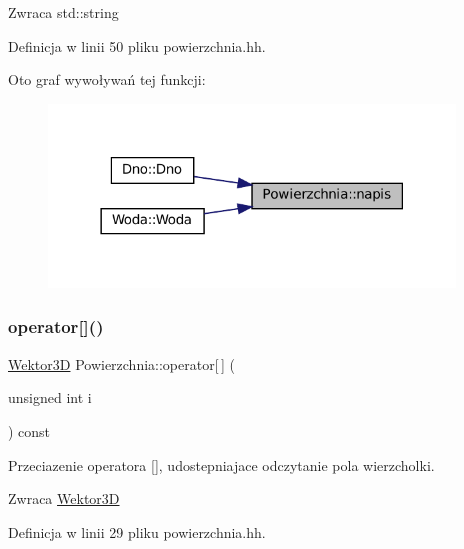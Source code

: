 \begin{DoxyReturn}{Zwraca}
std\+::string 
\end{DoxyReturn}


Definicja w linii 50 pliku powierzchnia.\+hh.

Oto graf wywoływań tej funkcji\+:\nopagebreak
\begin{figure}[H]
\begin{center}
\leavevmode
\includegraphics[width=306pt]{class_powierzchnia_ab6ff9b19f96772931a2861fde2f14ade_icgraph}
\end{center}
\end{figure}
\mbox{\label{class_powierzchnia_ad6359705945ff2b275950f918d34a49e}} 
\subsubsection{\texorpdfstring{operator[]()}{operator[]()}\hspace{0.1cm}{\footnotesize\ttfamily [1/2]}}
{\footnotesize\ttfamily \mbox{\hyperlink{class_wektor3_d}{Wektor3D}} Powierzchnia\+::operator\mbox{[}$\,$\mbox{]} (\begin{DoxyParamCaption}\item[{unsigned int}]{i }\end{DoxyParamCaption}) const\hspace{0.3cm}{\ttfamily [inline]}}

Przeciazenie operatora \mbox{[}\mbox{]}, udostepniajace odczytanie pola wierzcholki.

\begin{DoxyReturn}{Zwraca}
\mbox{\hyperlink{class_wektor3_d}{Wektor3D}} 
\end{DoxyReturn}


Definicja w linii 29 pliku powierzchnia.\+hh.

\mbox{\label{class_powierzchnia_a65630dfdb8e9601a04d186a74adff189}} 
